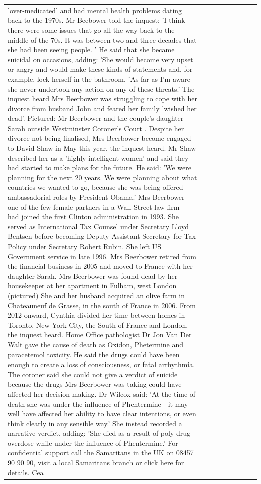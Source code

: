 \begin{table}[H]
\begin{tabular}{lllrlllll}
'over-medicated' and had mental health problems dating back to the 1970s. Mr Beebower told the inquest: 'I think there were some issues that go all the way back to the middle of the 70s. It was between two and three decades that she had been seeing people. ' He said that she became suicidal on occasions, adding: 'She would become very upset or angry and would make these kinds of statements and, for example, lock herself in the bathroom. 'As far as I'm aware she never undertook any action on any of these threats.' The inquest heard Mrs Beerbower was struggling to cope with her divorce from husband John and feared her family 'wished her dead'. Pictured: Mr Beerbower and the couple's daughter Sarah outside Westminster Coroner's Court . Despite her divorce not being finalised, Mrs Beerbower become engaged to David Shaw in May this year, the inquest heard. Mr Shaw described her as a 'highly intelligent women' and said they had started to make plans for the future. He said: 'We were planning for the next 20 years. We were planning about what countries we wanted to go, because she was being offered ambassadorial roles by President Obama.' Mrs Beerbower - one of the few female partners in a Wall Street law firm - had joined the first Clinton administration in 1993. She served as International Tax Counsel under Secretary Lloyd Bentsen before becoming Deputy Assistant Secretary for Tax Policy under Secretary Robert Rubin. She left US Government service in late 1996. Mrs Beerbower retired from the financial business in 2005 and moved to France with her daughter Sarah. Mrs Beerbower was found dead by her housekeeper at her apartment in Fulham, west London (pictured) She and her husband acquired an olive farm in Chateauneuf de Grasse, in the south of France in 2006. From 2012 onward, Cynthia divided her time between homes in Toronto, New York City, the South of France and London, the inquest heard. Home Office pathologist Dr Jon Van Der Walt gave the cause of death as Oxidon, Phetermine and paracetemol toxicity. He said the drugs could have been enough to create a loss of consciousness, or fatal arrhythmia. The coroner said she could not give a verdict of suicide because the drugs Mrs Beerbower was taking could have affected her decision-making. Dr Wilcox said: 'At the time of death she was under the influence of Phentermine - it may well have affected her ability to have clear intentions, or even think clearly in any sensible way.' She instead recorded a narrative verdict, adding: 'She died as a result of poly-drug overdose while under the influence of Phentermine.' For confidential support call the Samaritans in the UK on 08457 90 90 90, visit a local Samaritans branch or click here for details. Cea \\

\end{tabular}
\end{table}
